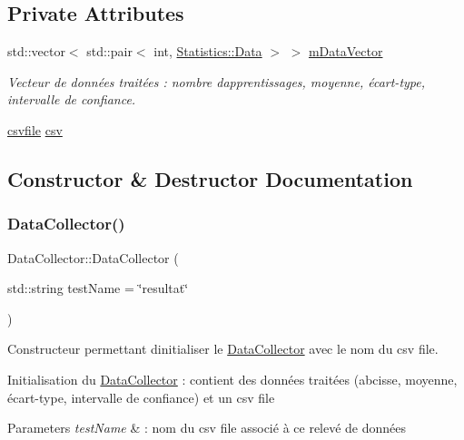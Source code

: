 \subsection*{Private Attributes}
\begin{DoxyCompactItemize}
\item 
std\+::vector$<$ std\+::pair$<$ int, \hyperlink{structStatistics_1_1Data}{Statistics\+::\+Data} $>$ $>$ \hyperlink{classDataCollector_a8d1d5a743e394b578545fa2d7b0ce4ee}{m\+Data\+Vector}
\begin{DoxyCompactList}\small\item\em Vecteur de données traitées \+: nombre d\textquotesingle{}apprentissages, moyenne, écart-\/type, intervalle de confiance. \end{DoxyCompactList}\item 
\hyperlink{classcsvfile}{csvfile} \hyperlink{classDataCollector_a8150de03c388af2d36cfb8f15cd28189}{csv}
\end{DoxyCompactItemize}


\subsection{Constructor \& Destructor Documentation}
\mbox{\label{classDataCollector_a8061e46d6301b7a766bd628472353b44}} 
\subsubsection{\texorpdfstring{Data\+Collector()}{DataCollector()}}
{\footnotesize\ttfamily Data\+Collector\+::\+Data\+Collector (\begin{DoxyParamCaption}\item[{std\+::string}]{test\+Name = {\ttfamily \char`\"{}resultat\char`\"{}} }\end{DoxyParamCaption})}



Constructeur permettant d\textquotesingle{}initialiser le \hyperlink{classDataCollector}{Data\+Collector} avec le nom du csv file. 

Initialisation du \hyperlink{classDataCollector}{Data\+Collector} \+: contient des données traitées (abcisse, moyenne, écart-\/type, intervalle de confiance) et un csv file 
\begin{DoxyParams}{Parameters}
{\em test\+Name} & \+: nom du csv file associé à ce relevé de données \\
\hline
\end{DoxyParams}


